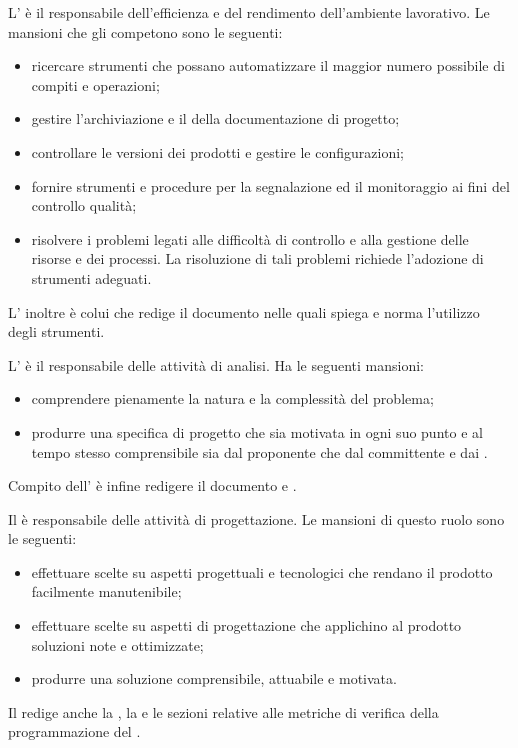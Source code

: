 \documentclass[a4paper, titlepage]{article}
\begin{document}
L' è il responsabile dell'efficienza e del rendimento dell'ambiente lavorativo. Le mansioni che gli competono sono le seguenti:
\begin{itemize}
	\item ricercare strumenti che possano automatizzare il maggior numero possibile di compiti e operazioni;
	\item gestire l'archiviazione e il  della documentazione di progetto;
	\item controllare le versioni dei prodotti e gestire le configurazioni;
	\item fornire strumenti e procedure per la segnalazione ed il monitoraggio ai fini del controllo qualità;
	\item risolvere i problemi legati alle difficoltà di controllo e alla gestione delle risorse e dei processi. La risoluzione di tali problemi richiede l'adozione di strumenti adeguati.
\end{itemize}
L' inoltre è colui che redige il documento  nelle quali spiega e norma l'utilizzo degli strumenti.

L' è il responsabile delle attività di analisi. Ha le seguenti mansioni:
\begin{itemize}
	\item comprendere pienamente la natura e la complessità del problema;
	\item produrre una specifica di progetto che sia motivata in ogni suo punto e al tempo stesso comprensibile sia dal proponente che dal committente e dai .
\end{itemize}
Compito dell' è infine redigere il documento  e .

Il  è responsabile delle attività di progettazione. Le mansioni di questo ruolo sono le seguenti:
\begin{itemize}
	\item effettuare scelte su aspetti progettuali e tecnologici che rendano il prodotto facilmente manutenibile;
	\item effettuare scelte su aspetti di progettazione che applichino al prodotto soluzioni note e ottimizzate;
	\item produrre una soluzione comprensibile, attuabile e motivata.
\end{itemize}
Il  redige anche la , la  e le sezioni relative alle metriche di verifica della programmazione del .
\end{document}
